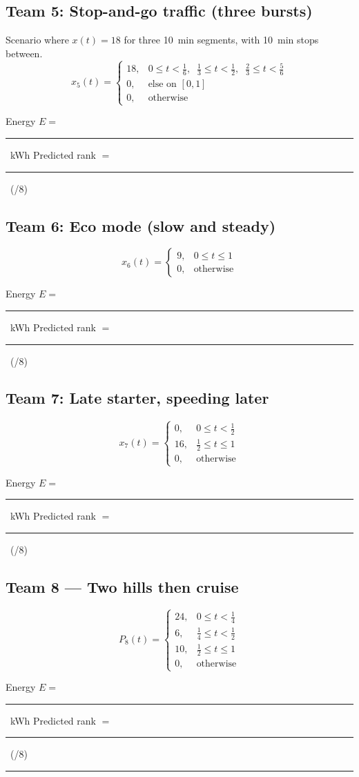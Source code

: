 \documentclass[11pt]{article}
\newcommand{\Eblank}{\rule{3cm}{0.4pt}}
\newcommand{\Rankblank}{\rule{3cm}{0.4pt}}
\begin{document}
\subsection*{Team 5: Stop-and-go traffic (three bursts)}
Scenario where $x(t) = 18$ for three \SI{10}{min} segments, with \SI{10}{min} stops between.
\[
x_5(t)=
\begin{cases}
18, & 0 \le t < \tfrac{1}{6}, \;\;\tfrac{1}{3}\le t < \tfrac{1}{2}, \;\;\tfrac{2}{3}\le t < \tfrac{5}{6} \\
0,  & \text{else on }[0,1]\\
0,  & \text{otherwise}
\end{cases}
\]
\begin{tcolorbox}[title=Team 5: Record your results]
Energy \(E=\) \Eblank\ \si{kWh} \quad\quad Predicted rank \(=\) \Rankblank\ (/8)
\end{tcolorbox}

\subsection*{Team 6: Eco mode (slow and steady)}
\[
x_6(t)=
\begin{cases}
9, & 0 \le t \le 1 \\
0, & \text{otherwise}
\end{cases}
\]
\begin{tcolorbox}[title=Team 6: Record your results]
Energy \(E=\) \Eblank\ \si{kWh} \quad\quad Predicted rank \(=\) \Rankblank\ (/8)
\end{tcolorbox}

\subsection*{Team 7: Late starter, speeding later}
\[
x_7(t)=
\begin{cases}
0, & 0 \le t < \tfrac{1}{2} \\
16, & \tfrac{1}{2} \le t \le 1 \\
0, & \text{otherwise}
\end{cases}
\]
\begin{tcolorbox}[title=Team 7: Record your results]
Energy \(E=\) \Eblank\ \si{kWh} \quad\quad Predicted rank \(=\) \Rankblank\ (/8)
\end{tcolorbox}

\subsection*{Team 8 — Two hills then cruise}
\[
P_8(t)=
\begin{cases}
24, & 0 \le t < \tfrac{1}{4} \\
6,  & \tfrac{1}{4} \le t < \tfrac{1}{2} \\
10, & \tfrac{1}{2} \le t \le 1 \\
0,  & \text{otherwise}
\end{cases}
\]
\begin{tcolorbox}[title=Team 8: Record your results]
Energy \(E=\) \Eblank\ \si{kWh} \quad\quad Predicted rank \(=\) \Rankblank\ (/8)
\end{tcolorbox}

\bigskip
\hrule
\bigskip
\end{document}
